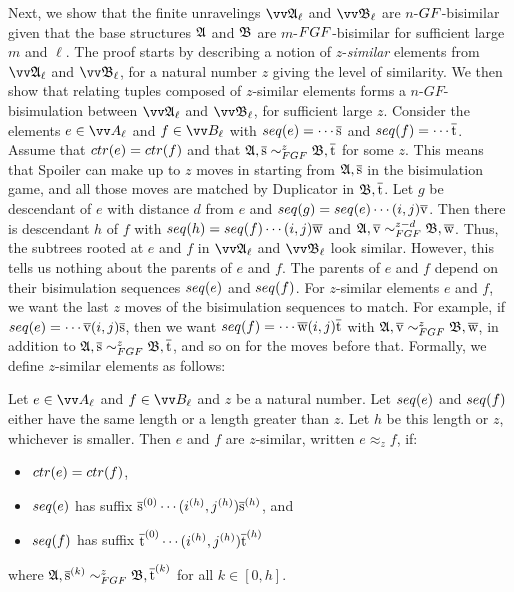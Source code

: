 Next, we show that the finite unravelings $\unravel{A}_{\ell}$ and $\unravel{B}_{\ell}$ are $n$-$\GF$-bisimilar given that the base structures ${\mathfrak{A}}$ and ${\mathfrak{B}}$ are $m$-$\FGF$-bisimilar for sufficient large $m$ and $\ell$.
The proof starts by describing a notion of $z$-\emph{similar} elements from $\unravel{A}_{\ell}$ and $\unravel{B}_{\ell}$, for a natural number $z$ giving the level of similarity.
We then show that relating tuples composed of $z$-similar elements forms a $n$-$GF$-bisimulation between $\unravel{A}_{\ell}$ and $\unravel{B}_{\ell}$, for sufficient large $z$.
Consider the elements $e \in \unraveldom{A}_{\ell}$ and $f \in \unraveldom{B}_{\ell}$ with $\seq{e} = \cdots\elemtuples$ and $\seq{f} = \cdots\elemtuplet$.
Assume that $\ctr{e} = \ctr{f}$ and that $\str{A}, \elemtuples \bisimto_{\FGF}^{z} \str{B}, \elemtuplet$ for some $z$.
This means that Spoiler can make up to $z$ moves in starting from ${\mathfrak{A}}, \overline{\mathrm{s}}$ in the bisimulation game, and all those moves are matched by Duplicator in ${\mathfrak{B}}, \overline{\mathrm{t}}$.
Let $g$ be descendant of $e$ with distance $d$ from $e$ and $\seq{g} = \seq{e}\cdots(i,j)\elemtuplev$.
Then there is descendant $h$ of $f$ with $\seq{h} = \seq{f}\cdots(i,j)\elemtuplew$ and $\str{A}, \elemtuplev \bisimto_{\FGF}^{z-d} \str{B}, \elemtuplew$.
Thus, the subtrees rooted at $e$ and $f$ in $\unravel{A}_{\ell}$ and $\unravel{B}_{\ell}$ look similar.
However, this tells us nothing about the parents of $e$ and $f$.
The parents of $e$ and $f$ depend on their bisimulation sequences $\seq{e}$ and $\seq{f}$.
For $z$-similar elements $e$ and $f$, we want the last $z$ moves of the bisimulation sequences to match.
For example, if $\seq{e} = \cdots\elemtuplev(i,j)\elemtuples$, then we want $\seq{f} = \cdots\elemtuplew(i,j)\elemtuplet$ with $\str{A}, \elemtuplev \bisimto_{\FGF}^{z} \str{B}, \elemtuplew$, in addition to $\str{A}, \elemtuples \bisimto_{\FGF}^{z} \str{B}, \elemtuplet$, and so on for the moves before that.
Formally, we define $z$-similar elements as follows:
\begin{definition}
 Let $e \in \unraveldom{A}_{\ell}$ and $f \in \unraveldom{B}_{\ell}$ and $z$ be a natural number.
 Let $\seq{e}$ and $\seq{f}$ either have the same length or a length greater than $z$.
 Let $h$ be this length or $z$, whichever is smaller.
 Then $e$ and $f$ are $z$-similar, written $e \approx_{z} f$, if:
 \begin{itemize}
   \item $\ctr{e} = \ctr{f}$,
   \item $\seq{e}$ has suffix $\overline{\mathrm{s}}^{(0)}\cdots(i^{(h)},j^{(h)})\overline{\mathrm{s}}^{(h)}$, and
   \item $\seq{f}$ has suffix $\overline{\mathrm{t}}^{(0)}\cdots(i^{(h)},j^{(h)})\overline{\mathrm{t}}^{(h)}$
 \end{itemize}
 where $\str{A}, \elemtuples^{(k)} \bisimto_{\FGF}^{z} \str{B}, \elemtuplet^{(k)}$ for all $k \in [0,h]$.
\end{definition}

